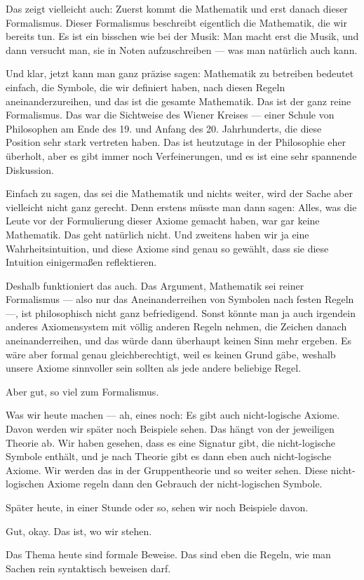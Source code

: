 \begin{spoken-clean}[00:08:40 - 00:10:03]
Das zeigt vielleicht auch: Zuerst kommt die Mathematik und erst danach dieser Formalismus. Dieser Formalismus beschreibt eigentlich die Mathematik, die wir bereits tun. Es ist ein bisschen wie bei der Musik: Man macht erst die Musik, und dann versucht man, sie in Noten aufzuschreiben --- was man natürlich auch kann. 

Und klar, jetzt kann man ganz präzise sagen: Mathematik zu betreiben bedeutet einfach, die Symbole, die wir definiert haben, nach diesen Regeln aneinanderzureihen, und das ist die gesamte Mathematik. Das ist der ganz reine Formalismus. Das war die Sichtweise des Wiener Kreises --- einer Schule von Philosophen am Ende des 19. und Anfang des 20. Jahrhunderts, die diese Position sehr stark vertreten haben. Das ist heutzutage in der Philosophie eher überholt, aber es gibt immer noch Verfeinerungen, und es ist eine sehr spannende Diskussion. 

Einfach zu sagen, das sei die Mathematik und nichts weiter, wird der Sache aber vielleicht nicht ganz gerecht. Denn erstens müsste man dann sagen: Alles, was die Leute vor der Formulierung dieser Axiome gemacht haben, war gar keine Mathematik. Das geht natürlich nicht. Und zweitens haben wir ja eine Wahrheitsintuition, und diese Axiome sind genau so gewählt, dass sie diese Intuition einigermaßen reflektieren. 

Deshalb funktioniert das auch. Das Argument, Mathematik sei reiner Formalismus --- also nur das Aneinanderreihen von Symbolen nach festen Regeln ---, ist philosophisch nicht ganz befriedigend. Sonst könnte man ja auch irgendein anderes Axiomensystem mit völlig anderen Regeln nehmen, die Zeichen danach aneinanderreihen, und das würde dann überhaupt keinen Sinn mehr ergeben. Es wäre aber formal genau gleichberechtigt, weil es keinen Grund gäbe, weshalb unsere Axiome sinnvoller sein sollten als jede andere beliebige Regel. 

Aber gut, so viel zum Formalismus.
\end{spoken-clean}

\begin{spoken-clean}[00:10:03 - 00:11:47]
Was wir heute machen --- ah, eines noch: Es gibt auch nicht-logische Axiome. Davon werden wir später noch Beispiele sehen. Das hängt von der jeweiligen Theorie ab. Wir haben gesehen, dass es eine Signatur gibt, die nicht-logische Symbole enthält, und je nach Theorie gibt es dann eben auch nicht-logische Axiome. Wir werden das in der Gruppentheorie und so weiter sehen. Diese nicht-logischen Axiome regeln dann den Gebrauch der nicht-logischen Symbole. 

Später heute, in einer Stunde oder so, sehen wir noch Beispiele davon. 

Gut, okay. Das ist, wo wir stehen. 

Das Thema heute sind formale Beweise. Das sind eben die Regeln, wie man Sachen rein syntaktisch beweisen darf. 

\end{spoken-clean}


